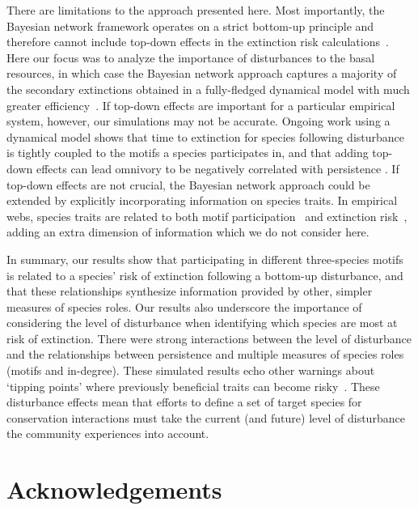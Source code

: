 \documentclass[12pt]{article}
\begin{document}
\begin{spacing}{2.0}
    
    There are limitations to the approach presented here.
    Most importantly, the Bayesian network framework operates on a  strict bottom-up principle and therefore cannot include top-down effects in the extinction risk calculations~\citep{Eklof2013}. 
    Here our focus was to analyze the importance of disturbances to the basal resources, in which case the Bayesian network approach captures a majority of the secondary extinctions obtained in a fully-fledged dynamical model with much greater efficiency~\citep{Eklof2013}.
    If top-down effects are important for a particular empirical system, however, our simulations may not be accurate. 
    Ongoing work using a dynamical model shows that time to extinction for species following disturbance is tightly coupled to the motifs a species participates in, and that adding top-down effects can lead omnivory to be negatively correlated with persistence \citep{Cirtwill2021_inprep}. 
    If top-down effects are not crucial, the Bayesian network approach could be extended by explicitly incorporating information on species traits.
    In empirical webs, species traits are related to both motif participation~\citep{cirtwill2018feeding} and extinction risk~\citep{Brose2017, curtsdotter2011robustness, Cardillo2005, Purvis2000},
    adding an extra dimension of information which we do not consider here.
    
    In summary, our results show that participating in different three-species motifs is related to a species' risk of extinction following a bottom-up disturbance, and that these relationships synthesize information provided by other, simpler measures of species roles.
    Our results also underscore the importance of considering the level of disturbance when identifying which species are most at risk of extinction.
    There were strong interactions between the level of disturbance and the relationships between persistence and multiple measures of species roles (motifs and in-degree).
    These simulated results echo other warnings about `tipping points' where previously beneficial traits can become risky~\citep{Latty2019,Golubski2016,Tylianakis2014}.
    These disturbance effects mean that efforts to define a set of target species for conservation interactions must take the current (and future) level of disturbance the community experiences into account.
    
\section*{Acknowledgements}


\end{spacing}
\end{document}
